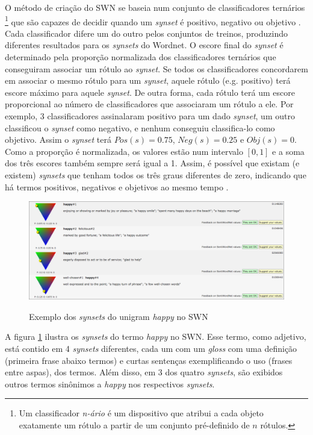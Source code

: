 \documentclass[template.tex]{subfiles}
\begin{document}
O método de criação do SWN se baseia num conjunto de classificadores ternários \footnote{Um classificador \textit{n-ário} é um dispositivo que atribui a cada objeto exatamente um rótulo a partir de um conjunto pré-definido de $n$ rótulos.} que são capazes de decidir quando um \textit{synset} é positivo, negativo ou objetivo \cite{esuli2006sentiwordnet}. Cada classificador difere um do outro pelos conjuntos de treinos, produzindo diferentes resultados para os \textit{synsets} do Wordnet. O escore final do \textit{synset} é determinado pela proporção normalizada dos classificadores ternários que conseguiram associar um rótulo ao \textit{synset}. Se todos os classificadores concordarem em associar o mesmo rótulo para um \textit{synset}, aquele rótulo (e.g. positivo) terá escore máximo para aquele \textit{synset}. De outra forma, cada rótulo terá um escore proporcional ao número de classificadores que associaram um rótulo a ele. Por exemplo, 3 classificadores assinalaram positivo para um dado \textit{synset}, um outro classificou o \textit{synset} como negativo, e nenhum conseguiu classifica-lo como objetivo. Assim o \textit{synset} terá $Pos(s) = 0.75$, $Neg(s) = 0.25$ e $Obj(s) = 0$. Como a proporção é normalizada, os valores estão num intervalo $[0,1]$ e a soma dos três escores também sempre será igual a 1. Assim, é possível que existam (e existem) \textit{synsets} que tenham todos os três graus diferentes de zero, indicando que há termos positivos, negativos e objetivos ao mesmo tempo \cite{esuli2006sentiwordnet}. 

\begin{figure}[h]
\caption{Exemplo dos \textit{synsets} do unigram \textit{happy} no SWN}
\centering
\includegraphics[scale=0.35]{happy_synsets}
\label{figura:happy_synsets}
\end{figure}
 
 
A figura \ref{figura:happy_synsets} ilustra os \textit{synsets} do termo \textit{happy} no SWN. Esse termo, como adjetivo, está contido em 4 \textit{synsets} diferentes, cada um com um \textit{gloss} com uma definição (primeira frase abaixo termos) e curtas sentenças exemplificando o uso (frases entre aspas), dos termos. Além disso, em 3 dos quatro \textit{synsets}, são exibidos outros termos sinônimos a \textit{happy} nos respectivos \textit{synsets}.
 
\end{document}
